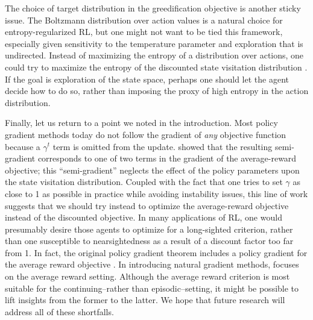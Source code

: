 \documentclass[\main/thesis.tex]{subfiles}
\begin{document}
The choice of target distribution in the greedification objective is another sticky issue. The Boltzmann distribution over action values is a natural choice for entropy-regularized RL, but one might not want to be tied this framework, especially given sensitivity to the temperature parameter and exploration that is undirected. Instead of maximizing the entropy of a distribution over actions, one could try to maximize the entropy of the discounted state visitation distribution \citep{islam2019entropy}. If the goal is exploration of the state space, perhaps one should let the agent decide how to do so, rather than imposing the proxy of high entropy in the action distribution. 

Finally, let us return to a point we noted in the introduction. Most policy gradient methods today do not follow the gradient of \textit{any} objective function \citep{thomas2014bias,nota2019policy} because a $\gamma^t$ term is omitted from the update. \citet{thomas2014bias} showed that the resulting semi-gradient corresponds to one of two terms in the gradient of the average-reward objective; this ``semi-gradient'' neglects the effect of the policy parameters upon the state visitation distribution. Coupled with the fact that one tries to set $\gamma$ as close to 1 as possible in practice while avoiding instability issues, this line of work suggests that we should try instead to optimize the average-reward objective instead of the discounted objective. In many applications of RL, one would presumably desire those agents to optimize for a long-sighted criterion, rather than one susceptible to nearsightedness as a result of a discount factor too far from 1. In fact, the original policy gradient theorem includes a policy gradient for the average reward objective \citep{sutton2000policy}. In introducing natural gradient methods, \citet{kakade2002natural} focuses on the average reward setting. Although the average reward criterion is most suitable for the continuing--rather than episodic--setting, it might be possible to lift insights from the former to the latter. We hope that future research will address all of these shortfalls. 
\end{document}
